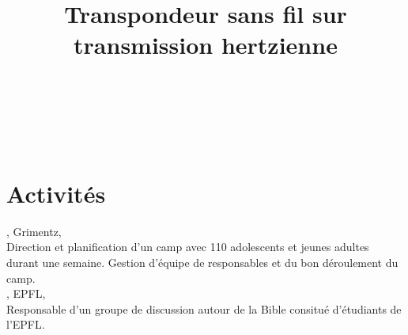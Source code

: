 \documentclass[mm]{simple_style}
\begin{document}
\begin{resume}
\begin{project}
\end{project}
\begin{project}
  \title{Transpondeur sans fil sur transmission hertzienne}
  \\
\end{project}\\
\sectionline

\section{Activit\'es}
, Grimentz, \\
Direction et planification d’un camp avec 110 adolescents et jeunes adultes durant une semaine. Gestion d'\'equipe de responsables et du bon d\'eroulement du camp.\\
, EPFL, \\
Responsable d'un groupe de discussion autour de la Bible consitu\'e d'\'etudiants de l'EPFL.


\end{resume}
\end{document}
